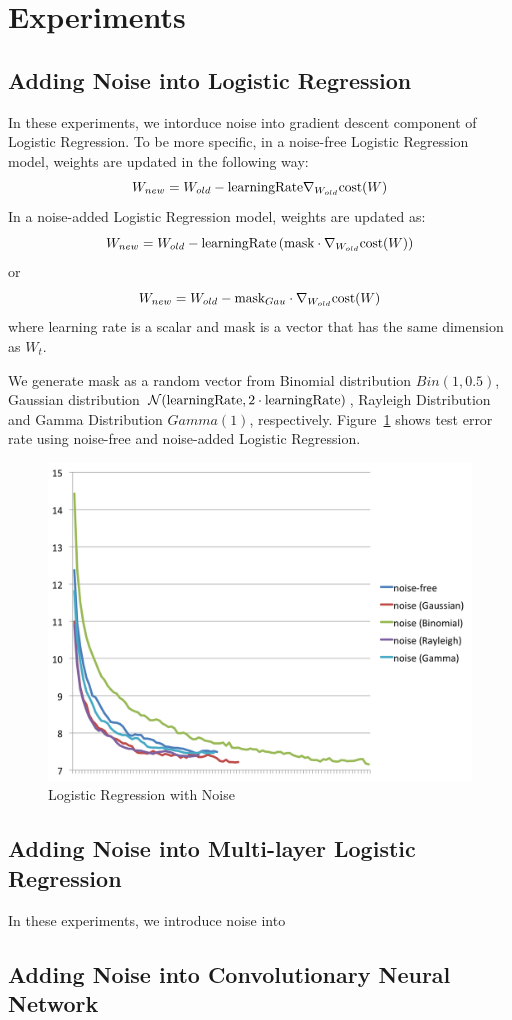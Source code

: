 \section{Experiments}
\label{sec:experiments}


\subsection{Adding Noise into Logistic Regression}
In these experiments, we intorduce noise into gradient descent component
of Logistic Regression.
To be more specific, in a noise-free Logistic Regression model, weights
are updated in the following way:
\[
W_{new} = W_{old} - \text{learningRate} \nabla_{W_{old}} \text{cost}(W)
\]
In a noise-added Logistic Regression model, weights are updated as:
\[
W_{new}=W_{old}-\text{learningRate} \left(\text{mask} \cdot \nabla_{W_{old}}\text{cost}(W) \right)
\]
or
\[
W_{new} = W_{old} - \text{mask}_{Gau} \cdot \nabla_{W_{old}} \text{cost}(W)
\]
where learning rate is a scalar and mask is a vector that has the same dimension as $W_t$.

We generate mask as a random vector from Binomial distribution
$Bin(1,0.5)$, Gaussian distribution $\mathcal{N}(\text{learningRate}, 2 \cdot \text{learningRate})$,
Rayleigh Distribution and Gamma Distribution $Gamma(1)$, respectively.
Figure~\ref{logistic} shows test error rate using noise-free and
noise-added Logistic Regression.
\begin{figure}[!htbp]
\centering
\label{logistic}
\caption{Logistic Regression with Noise}
\includegraphics[width=\textwidth]{f-figs/logistic.png}
\end{figure}


\subsection{Adding Noise into Multi-layer Logistic Regression}
In these experiments, we introduce noise into

\subsection{Adding Noise into Convolutionary Neural Network}


